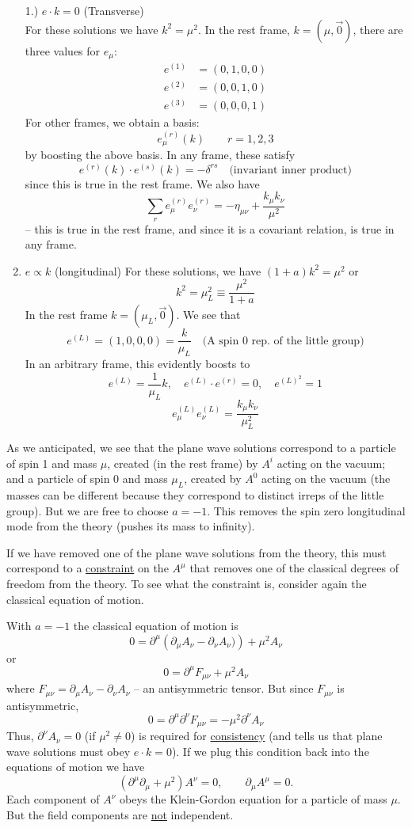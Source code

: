 \documentclass[letterpaper]{article}
\newcommand{\pd}[1]{\partial_{#1}}
\newcommand{\pu}[1]{\partial^{#1}}
\begin{document}
	\begin{enumerate}
	\item[1.)] \underline{$e \cdot k = 0$} (Transverse) \\
	For these solutions we have $k^2 = \mu^2$. In the rest frame, $k = (\mu, \vec{0})$, there are three values for $e_\mu$:
	\begin{align*}
	e^{(1)} &= (0,1,0,0) \\
	e^{(2)} &= (0,0,1,0) \\
	e^{(3)} &= (0,0,0,1)
	\end{align*}
	For other frames, we obtain a basis:
	$$e_\mu^{(r)}(k) \qquad r = 1,2,3$$
	by boosting the above basis.
	In any frame, these satisfy
	$$e^{(r)}(k)\cdot e^{(s)}(k) = -\delta^{rs} \quad \text{(invariant inner product)}$$
	since this is true in the rest frame. We also have
	$$\sum_{r} e_\mu^{(r)}e_\nu^{(r)} = -\eta_{\mu\nu} + \frac{k_\mu k_\nu}{\mu^2}$$
	-- this is true in the rest frame, and since it is a covariant relation, is true in any frame.
	\item \underline{$e \propto k$} (longitudinal)
	For these solutions, we have $(1+a)k^2 = \mu^2$ or
	$$k^2 = \mu_L^2 \equiv \frac{\mu^2}{1+a}$$
	In the rest frame $k = (\mu_L, \vec{0})$. We see that
	$$e^{(L)} = (1,0,0,0) = \frac{k}{\mu_L} \quad \text{(A spin 0 rep. of the little group)}$$
	In an arbitrary frame, this evidently boosts to
	$$e^{(L)} = \frac{1}{\mu_L}k, \quad e^{(L)}\cdot e^{(r)} = 0, \quad e^{(L)^2} = 1$$
	$$e_\mu^{(L)}e_\nu^{(L)} = \frac{k_\mu k_\nu}{\mu_L^2}$$
	\end{enumerate}
	As we anticipated, we see that the plane wave solutions correspond to a particle of spin 1 and mass $\mu$, created (in the rest frame) by $A^i$ acting on the vacuum; and a particle of spin 0 and mass $\mu_L$, created by $A^0$ acting on the vacuum (the masses can be different because they correspond to distinct irreps of the little group). But we are free to choose $a = -1$. This removes the spin zero longitudinal mode from the theory (pushes its mass to infinity).
	\par If we have removed one of the plane wave solutions from the theory, this must correspond to a \underline{constraint} on the $A^\mu$ that removes one of the classical degrees of freedom from the theory. To see what the constraint is, consider again the classical equation of motion.
	\par With $a = -1$ the classical equation of motion is
	 $$0 = \pu{\mu}\left(\pd{\mu}A_\nu - \pd{\nu}A_\nu)\right) + \mu^2A_\nu$$
	 or
	 $$ 0 = \pu{\mu}F_{\mu\nu} + \mu^2A_\nu$$
	 where $F_{\mu\nu} = \pd{\mu}A_\nu - \pd{\nu}A_\nu$ --  an antisymmetric tensor. But since $F_{\mu\nu}$ is antisymmetric,
	 $$0 = \pu{\mu}\pu{\nu}F_{\mu\nu} = -\mu^2\pu{\nu}A_\nu$$
	 Thus, $\pu{\nu}A_\nu = 0$ (if $\mu^2 \neq 0$) is required for \underline{consistency} (and tells us that plane wave solutions must obey $e \cdot k = 0$). If we plug this condition back into the equations of motion we have
	 $$(\pu{\mu}\pd{\mu} + \mu^2)A^\nu = 0, \qquad \pd{\mu}A^\mu = 0.$$
	 Each component of $A^\nu$ obeys the Klein-Gordon equation for a particle of mass $\mu$. But the field components are \underline{not} independent.
\end{document}
